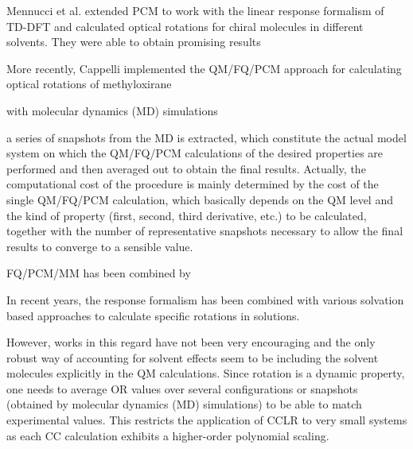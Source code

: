 Mennucci et al. extended PCM to work with the linear response formalism of TD-DFT\cite{Mennucci02}
and calculated optical rotations for chiral molecules in different solvents. They were able to obtain promising results

More recently, Cappelli implemented the
QM/FQ/PCM approach for calculating optical rotations of methyloxirane


with molecular dynamics (MD) simulations



 a series of snapshots from the MD is extracted, which constitute the actual model system on which the QM/FQ/PCM calculations of the desired properties are performed and then averaged out to obtain the final results. Actually, the computational cost of the procedure is mainly determined by the cost of the single QM/FQ/PCM calculation, which basically depends on the QM level and the kind of property (first, second, third derivative, etc.) to be calculated, together with the number of representative snapshots necessary to allow the final results to converge to a sensible value.



FQ/PCM/MM has been combined by

In recent years, the response formalism has been combined with various solvation based
approaches\cite{Neugebauer05,Neugebauer09,Mennucci02,Tomasi05,JensenGordon96}
to calculate specific rotations in solutions. 

However, works in this regard have not been very encouraging\cite{silva04,Stephens001,Kongsted05,Mennucci02} 
and the only robust way of accounting for solvent effects seem to be including the solvent molecules explicitly 
in the QM calculations. Since rotation is a dynamic property, one needs to average OR values over several 
configurations or snapshots (obtained by molecular dynamics (MD) simulations) to be able to match experimental 
values. This restricts the application of CCLR to very small systems as each CC calculation exhibits
a higher-order polynomial scaling.

